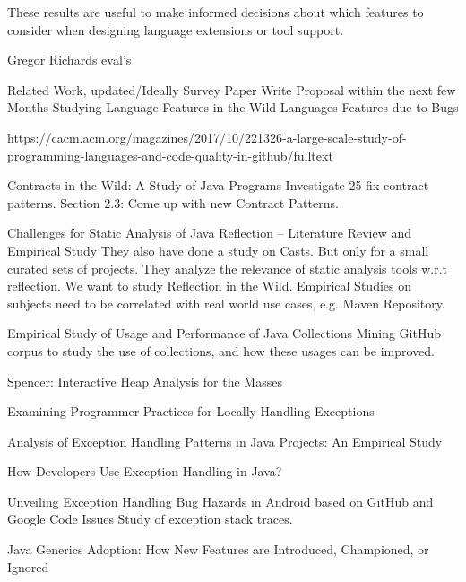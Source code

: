 These results are useful to make informed decisions about which features to consider when designing language extensions or tool support.

Gregor Richards eval's


Related Work, updated/Ideally Survey Paper
Write Proposal within the next few Months
Studying Language Features in the Wild
Languages Features due to Bugs

https://cacm.acm.org/magazines/2017/10/221326-a-large-scale-study-of-programming-languages-and-code-quality-in-github/fulltext









Contracts in the Wild: A Study of Java Programs
Investigate 25 fix contract patterns.
Section 2.3: Come up with new Contract Patterns.
\cite{dietrich_et_al:LIPIcs:2017:7259}

\cite{Landman:2017:CSA:3097368.3097429}
Challenges for Static Analysis of Java Reflection -- Literature Review and Empirical Study
They also have done a study on Casts.
But only for a small curated sets of projects.
They analyze the relevance of static analysis tools w.r.t reflection.
We want to study Reflection in the Wild.
Empirical Studies on subjects need to be correlated with real world use cases, e.g. Maven Repository.



Empirical Study of Usage and Performance of Java Collections
Mining GitHub corpus to study the use of collections, and how these usages can be improved.
\cite{Costa:2017:ESU:3030207.3030221}

Spencer: Interactive Heap Analysis for the Masses
\cite{DBLP:journals/corr/BrandauerW17}


Examining Programmer Practices for Locally Handling Exceptions
\cite{Kery:2016:EPP:2901739.2903497}

Analysis of Exception Handling Patterns in Java Projects: An Empirical Study
\cite{Nakshatri:2016:AEH:2901739.2903499}

How Developers Use Exception Handling in Java? 
\cite{Asaduzzaman:2016:DUE:2901739.2903500}

\cite{7180074}
Unveiling Exception Handling Bug Hazards in Android based on GitHub and Google Code Issues
Study of exception stack traces.

Java Generics Adoption: How New Features are Introduced, Championed, or Ignored~\cite{Parnin:2011:JGA:1985441.1985446}

